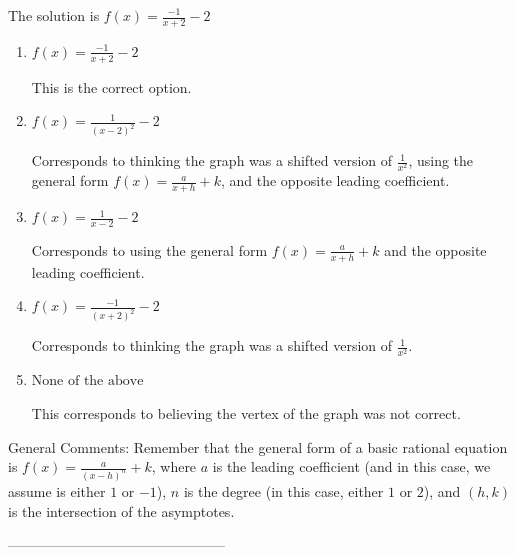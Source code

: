 \documentclass{article}[14pt]
\begin{document}
The solution is $ f(x) = \frac{-1}{x + 2} - 2 $ 

\begin{enumerate}[label=\Alph*.] 
\item $ f(x) = \frac{-1}{x + 2} - 2 $ 

 This is the correct option. 
\item $ f(x) = \frac{1}{(x - 2)^2} - 2 $ 

 Corresponds to thinking the graph was a shifted version of $\frac{1}{x^2}$, using the general form $f(x) = \frac{a}{x+h}+k$, and the opposite leading coefficient. 
\item $ f(x) = \frac{1}{x - 2} - 2 $ 

 Corresponds to using the general form $f(x) = \frac{a}{x+h}+k$ and the opposite leading coefficient. 
\item $ f(x) = \frac{-1}{(x + 2)^2} - 2 $ 

 Corresponds to thinking the graph was a shifted version of $\frac{1}{x^2}$. 
\item $ \text{None of the above} $ 

 This corresponds to believing the vertex of the graph was not correct. 
\end{enumerate} 
 
General Comments: Remember that the general form of a basic rational equation is $ f(x) = \frac{a}{(x-h)^n} + k$, where $a$ is the leading coefficient (and in this case, we assume is either $1$ or $-1$), $n$ is the degree (in this case, either $1$ or $2$), and $(h, k)$ is the intersection of the asymptotes.

-----------------------------------------------
\end{document}
